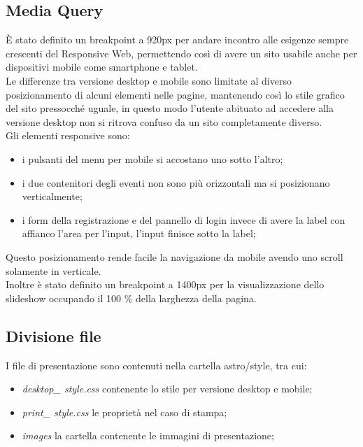 	\subsection{Media Query}
	È stato definito un breakpoint a 920px per andare incontro alle esigenze sempre crescenti del Responsive Web, permettendo così di avere un sito usabile anche per dispositivi mobile come smartphone e tablet. \\
	Le differenze tra versione desktop e mobile sono limitate al diverso posizionamento di alcuni elementi nelle pagine, mantenendo così lo stile grafico del sito pressocché uguale, in questo modo l'utente abituato ad accedere alla versione desktop non si ritrova confuso da un sito completamente diverso. \\
	Gli elementi responsive sono:
	\begin{itemize}
		\item i pulsanti del menu per mobile si accostano uno sotto l'altro;
		\item i due contenitori degli eventi non sono più orizzontali ma si posizionano verticalmente;
		\item i form della registrazione e del pannello di login invece di avere la label con affianco l'area per l'input, l'input finisce sotto la label;
	\end{itemize}  
	Questo posizionamento rende facile la navigazione da mobile avendo uno scroll solamente in verticale. \\
	Inoltre è stato definito un breakpoint a 1400px per la visualizzazione dello slideshow occupando il 100 \% della larghezza della pagina.
	\subsection{Divisione file}
	I file di presentazione sono contenuti nella cartella astro/style, tra cui:
	\begin{itemize}
		\item \textit{desktop\_ style.css} contenente lo stile per versione desktop e mobile;
		\item \textit{print\_ style.css} le proprietà nel caso di stampa;
		\item \textit{images} la cartella contenente le immagini di presentazione;
	\end{itemize}
